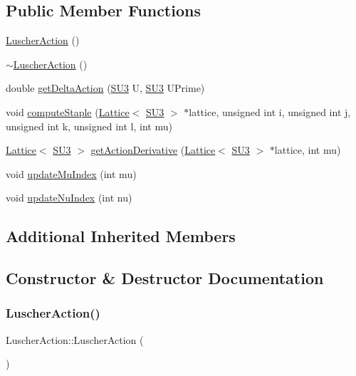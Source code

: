 \subsection*{Public Member Functions}
\begin{DoxyCompactItemize}
\item 
\mbox{\hyperlink{class_luscher_action_a2389aab5b35b4c5ccb0ae5a45f68430b}{Luscher\+Action}} ()
\item 
\mbox{\hyperlink{class_luscher_action_a3b4de167f04479da56fd4aa1e7fe0bbb}{$\sim$\+Luscher\+Action}} ()
\item 
double \mbox{\hyperlink{class_luscher_action_a1955f8eea8b0771f6c737c39e3fc11b2}{get\+Delta\+Action}} (\mbox{\hyperlink{class_s_u3}{S\+U3}} U, \mbox{\hyperlink{class_s_u3}{S\+U3}} U\+Prime)
\item 
void \mbox{\hyperlink{class_luscher_action_a42285b6e3015935588e1fab6b90c1a11}{compute\+Staple}} (\mbox{\hyperlink{class_lattice}{Lattice}}$<$ \mbox{\hyperlink{class_s_u3}{S\+U3}} $>$ $\ast$lattice, unsigned int i, unsigned int j, unsigned int k, unsigned int l, int mu)
\item 
\mbox{\hyperlink{class_lattice}{Lattice}}$<$ \mbox{\hyperlink{class_s_u3}{S\+U3}} $>$ \mbox{\hyperlink{class_luscher_action_ac11785b2df276816a098a87e6ac514c7}{get\+Action\+Derivative}} (\mbox{\hyperlink{class_lattice}{Lattice}}$<$ \mbox{\hyperlink{class_s_u3}{S\+U3}} $>$ $\ast$lattice, int mu)
\item 
void \mbox{\hyperlink{class_luscher_action_a2bfa5f9b8bfb0c4440732000d2281519}{update\+Mu\+Index}} (int mu)
\item 
void \mbox{\hyperlink{class_luscher_action_a6496c97ed38401c0d94855bf940fd6ff}{update\+Nu\+Index}} (int nu)
\end{DoxyCompactItemize}
\subsection*{Additional Inherited Members}


\subsection{Constructor \& Destructor Documentation}
\mbox{\label{class_luscher_action_a2389aab5b35b4c5ccb0ae5a45f68430b}} 
\subsubsection{\texorpdfstring{LuscherAction()}{LuscherAction()}}
{\footnotesize\ttfamily Luscher\+Action\+::\+Luscher\+Action (\begin{DoxyParamCaption}{ }\end{DoxyParamCaption})}

